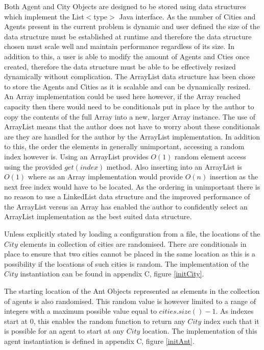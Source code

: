 Both Agent and City Objects are designed to be stored using data structures which implement the List$<$type$>$ Java interface. As the number of Cities and Agents present in the current problem is dynamic and user defined the size of the data structure must be established at runtime and therefore the data structure chosen must scale well and maintain performance regardless of its size. In addition to this, a user is able to modify the amount of Agents and Cties once created, therefore the data structure must be able to be effectively resized dynamically without complication. The ArrayList data structure has been chose to store the Agents and Cities as it is scalable and can be dynamically resized. An Array implementation could be used here however, if the Array reached capacity then there would need to be conditionals put in place by the author to copy the contents of the full Array into a new, larger Array instance. The use of ArrayList means that the author does not have to worry about these conditionals are they are handled for the author by the ArrayList implementation. In addition to this, the order the elements in generally unimportant, accessing a random index however is. Using an ArrayList provides $O(1)$ random element access using the provided $get(index)$ method. Also inserting into an ArrayList is $O(1)$ where as an Array implementation would provide $O(n)$ insertion as the next free index would have to be located. As the ordering in unimportant there is no reason to use a LinkedList data structure and the improved performance of the ArrayList versus an Array has enabled the author to confidently select an ArrayList implementation as the best suited data structure. 

Unless explicitly stated by loading a configuration from a file, the locations of the $City$ elements in collection of cities are randomised. There are conditionals in place to ensure that two cities cannot be placed in the same location as this is a possibility if the locations of such cities is random. The implementation of the $City$ instantiation can be found in appendix C, figure \ref{initCity}.

The starting location of the Ant Objects represented as elements in the collection of agents is also randomised. This random value is however limited to a range of integers with a maximum possible value equal to $cities.size() - 1$. As indexes start at 0, this enables the random function to return any $City$ index such that it is possible for an agent to start at any $City$ location. The implementation of this agent instantiation is defined in appendix C, figure \ref{initAnt}.

